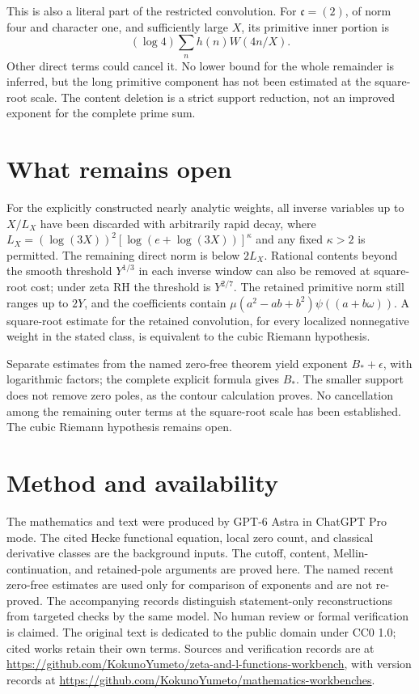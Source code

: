 \documentclass[11pt]{article}
\newcommand{\workbenchurl}{https://github.com/KokunoYumeto/zeta-and-l-functions-workbench}
\newcommand{\recordurl}{https://github.com/KokunoYumeto/mathematics-workbenches}
\begin{document}
This is also a literal part of the restricted convolution.
For $\mathfrak c=(2)$, of norm four and character one,
and sufficiently large $X$, its primitive inner portion is
\[
                         (\log4)\sum_n h(n)W(4n/X).
\]
Other direct terms could cancel it. No lower bound for the
whole remainder is inferred, but the long primitive component
has not been estimated at the square-root scale.
The content deletion is a strict support reduction, not an
improved exponent for the complete prime sum.


\section*{What remains open}
For the explicitly constructed nearly analytic weights, all inverse variables up to $X/L_X$ have been discarded with arbitrarily rapid decay, where $L_X=(\log(3X))^2[\log(e+\log(3X))]^\kappa$ and any fixed $\kappa>2$ is permitted. The remaining direct norm is below $2L_X$. Rational contents beyond the smooth threshold $Y^{1/3}$ in each inverse window can also be removed at square-root cost; under zeta RH the threshold is $Y^{2/7}$. The retained primitive norm still ranges up to $2Y$, and the coefficients contain $\mu(a^2-ab+b^2)\psi((a+b\omega))$. A square-root estimate for the retained convolution, for every localized nonnegative weight in the stated class, is equivalent to the cubic Riemann hypothesis.

Separate estimates from the named zero-free theorem yield exponent $B_*+\epsilon$, with logarithmic factors; the complete explicit formula gives $B_*$. The smaller support does not remove zero poles, as the contour calculation proves. No cancellation among the remaining outer terms at the square-root scale has been established. The cubic Riemann hypothesis remains open.

\section*{Method and availability}
The mathematics and text were produced by GPT-6 Astra in ChatGPT Pro mode.
The cited Hecke functional equation, local zero count, and classical
derivative classes are the background inputs. The cutoff, content,
Mellin-continuation, and retained-pole arguments are proved here.
The named recent zero-free estimates are used only for comparison of
exponents and are not re-proved. The accompanying records distinguish
statement-only reconstructions from targeted checks by the same model.
No human review or formal verification is claimed.
The original text is dedicated to the public domain under CC0 1.0;
cited works retain their own terms. Sources and verification records are
at \url{\workbenchurl}, with version records at \url{\recordurl}.
\end{document}
